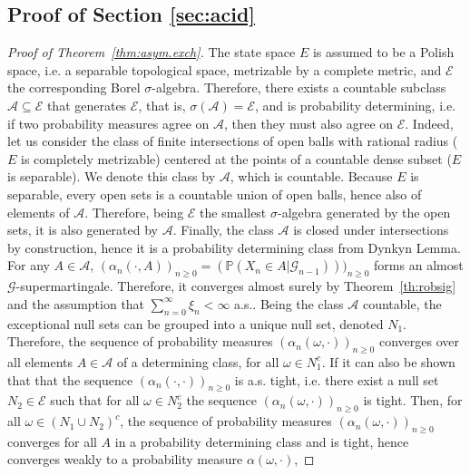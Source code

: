 \documentclass{article}
\theoremstyle{definition}
\renewcommand{\&}{and}
\begin{document}
\subsection{Proof of Section \ref{sec:acid}}
\begin{proof}[Proof of Theorem~\ref{thm:asym.exch}]
The state space $E$ is assumed to be a Polish space, i.e. a separable topological space, metrizable by a complete metric, and $\mathcal{E}$ the corresponding Borel $\sigma$-algebra. Therefore, there exists a countable subclass $\mathcal{A} \subseteq \mathcal{E}$ that generates $\mathcal{E}$, that is, $\sigma(\mathcal{A})=\mathcal{E}$, and is probability determining, i.e. if two probability measures agree on $\mathcal{A}$, then they must also agree on $\mathcal{E}$. Indeed, let us consider the class of finite intersections of open balls with rational radius ($E$ is completely metrizable) centered at the points of a countable dense subset ($E$ is separable). We denote this class by $\mathcal{A}$, which is countable. Because $E$ is separable, every open sets is a countable union of open balls, hence also of elements of $\mathcal{A}$. Therefore, being $\mathcal{E}$ the smallest $\sigma$-algebra generated by the open sets, it is also generated by $\mathcal{A}$. Finally, the class $\mathcal{A}$ is closed under intersections by construction, hence it is a probability determining class from Dynkyn Lemma.  \vspace{0.2cm} \\
For any $A \in \mathcal{A}$, $(\alpha_n(\cdot,A))_{n\geq 0} = ( \mathbb{P}(X_n \in A| \mathcal{G}_{n-1})) )_{n\geq 0}$ forms an almost $\mathcal{G}$-supermartingale. Therefore, it converges almost surely by Theorem~\ref{th:robsig} and the assumption that $\sum_{n=0}^\infty  \xi_n  < \infty$ a.s.. Being the class $\mathcal{A}$ countable, the exceptional null sets can be grouped into a unique null set, denoted $N_{1}$. 
Therefore, the sequence of probability measures $(\alpha_n(\omega,\cdot ))_{n\geq 0}$ converges over all elements $A\in \mathcal{A}$ of a determining class, for all $\omega \in N_{1}^{c}$. 
If it can also be shown that that the sequence $(\alpha_n(\cdot,\cdot))_{n\geq 0}$ is a.s. tight,
i.e. there exist a null set $N_{2}\in \mathcal{E}$ such that for all $\omega \in N_{2}^{c}$ the sequence $(\alpha_n(\omega,\cdot))_{n\geq 0}$ is tight. Then, for all $\omega \in (N_{1}\cup N_{2})^{c}$, the sequence of probability measures $(\alpha_n(\omega,\cdot))_{n\geq 0}$ converges for all $A$ in a probability determining class and is tight, hence converges weakly to a probability measure $\alpha(\omega,\cdot)$, 

\end{proof}
\end{document}
